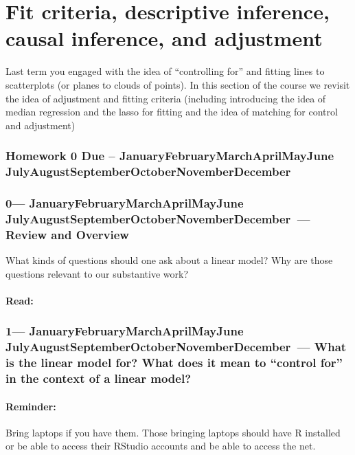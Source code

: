 \documentclass[10pt]{article}
\def\themonth{\ifcase\month\or
  January\or February\or March\or April\or May\or June\or
  July\or August\or September\or October\or November\or December\fi}
\begin{document}
\part{Fit criteria, descriptive inference, causal inference, and adjustment}

Last term you engaged with the idea of ``controlling for'' and fitting lines
to scatterplots (or planes to clouds of points). In this section of the course
we revisit the idea of adjustment and fitting criteria (including introducing
the idea of median regression and the lasso for fitting and the idea of
matching for control and adjustment)

\SetDate[24/01/2014]

\section{Homework 0 Due -- \themonth~\the\day}

\SetDate[27/01/2014]


\section{0---\themonth~\the\day--- Review and Overview}



What kinds of questions should one ask about a linear model? Why are
those questions relevant to our substantive work?

\subsection{Read:}

\citealp{berk2010you}

\citealp[Chap 1 and 2]{gerber2012field}

\citealp{holland:1986a}




\AdvanceDate[7]
\section{1---\themonth~\the\day--- What is the linear model for? What does
  it mean to ``control for'' in the context of a linear model? }

\subsection{Reminder:} Bring laptops if you have them. Those bringing
laptops should have R installed or be able to access their RStudio
accounts and be able to access the net.
\end{document}

